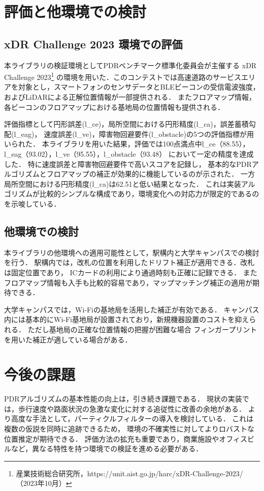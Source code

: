 \documentclass[a4paper, 10pt, twocolumn]{jarticle}
\begin{document}
\section{評価と他環境での検討}

\subsection{xDR Challenge 2023 環境での評価}

本ライブラリの検証環境としてPDRベンチマーク標準化委員会が主催する
xDR Challenge 2023\footnote{産業技術総合研究所，https://unit.aist.go.jp/harc/xDR-Challenge-2023/（2023年10月）}
の環境を用いた．このコンテストでは高速道路のサービスエリアを対象とし，スマートフォンのセンサデータとBLEビーコンの受信電波強度，
およびLiDARによる正解位置情報が一部提供される．
またフロアマップ情報，各ビーコンのフロアマップにおける基地局の位置情報も提供される．

評価指標として円形誤差(l\_ce)，局所空間における円形精度(l\_ca)，誤差蓄積勾配(l\_eag)，
速度誤差(l\_ve)，障害物回避要件(l\_obstacle)の5つの評価指標が用いられた．
本ライブラリを用いた結果，評価では100点満点中l\_ce（88.55），l\_eag（93.02），l\_ve（95.55），l\_obstacle（93.48）
において一定の精度を達成した．
特に速度誤差と障害物回避要件で高いスコアを記録し，
基本的なPDRアルゴリズムとフロアマップの補正が効果的に機能しているのが示された．
一方局所空間における円形精度(l\_ca)は62.51と低い結果となった．
これは実装アルゴリズムが比較的シンプルな構成であり，環境変化への対応力が限定的であるのを示唆している．

\subsection{他環境での検討}
本ライブラリの他環境への適用可能性として，駅構内と大学キャンパスでの検討を行う．
駅構内では，改札の位置を利用したドリフト補正が適用できる．改札は固定位置であり，
ICカードの利用により通過時刻も正確に記録できる．
またフロアマップ情報も入手も比較的容易であり，マップマッチング補正の適用が期待できる．

大学キャンパスでは，Wi-Fiの基地局を活用した補正が有効である．
キャンパス内には基本的にWi-Fi基地局が設置されており，新規機器設置のコストを抑えられる．
ただし基地局の正確な位置情報の把握が困難な場合
フィンガープリントを用いた補正が適している場合がある．



\section{今後の課題}
PDRアルゴリズムの基本性能の向上は，引き続き課題である．
現状の実装では，歩行速度や路面状況の急激な変化に対する追従性に改善の余地がある．
より高度な手法として，パーティクルフィルターの導入を検討している．
これは複数の仮説を同時に追跡できるため，
環境の不確実性に対してよりロバストな位置推定が期待できる．
評価方法の拡充も重要であり，商業施設やオフィスビルなど，異なる特性を持つ環境での検証を進める必要がある．




\end{document}
